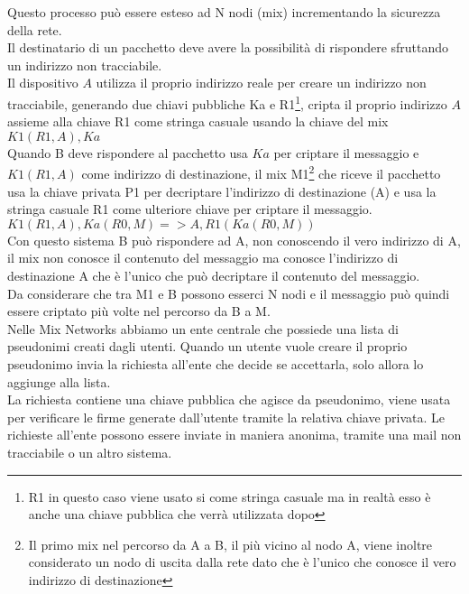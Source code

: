 Questo processo può essere esteso ad N nodi (mix) incrementando la sicurezza della rete. \\
\newline
Il destinatario di un pacchetto deve avere la possibilità di rispondere sfruttando un indirizzo non tracciabile. \\
Il dispositivo $A$ utilizza il proprio indirizzo reale per creare un indirizzo non tracciabile, generando due chiavi pubbliche Ka e R1\footnote{R1 in questo caso viene usato si come stringa casuale ma in realtà esso è anche una chiave pubblica che verrà utilizzata dopo}, cripta il proprio indirizzo $A$ assieme alla chiave R1 come stringa casuale usando la chiave del mix \\
$K1(R1, A), Ka$ \\
Quando B deve rispondere al pacchetto usa $Ka$ per criptare il messaggio e $K1(R1, A)$ come indirizzo di destinazione, il mix M1\footnote{Il primo mix nel percorso da A a B, il più vicino al nodo A, viene inoltre considerato un nodo di uscita dalla rete dato che è l'unico che conosce il vero indirizzo di destinazione} che riceve il pacchetto usa la chiave privata P1 per decriptare l'indirizzo di destinazione (A) e usa la stringa casuale R1 come ulteriore chiave per criptare il messaggio. \\
$K1( R1, A ), Ka( R0, M ) => A, R1( Ka( R0, M ) )$ \\
Con questo sistema B può rispondere ad A, non conoscendo il vero indirizzo di A, il mix non conosce il contenuto del messaggio ma conosce l'indirizzo di destinazione A che è l'unico che può decriptare il contenuto del messaggio. \\
Da considerare che tra M1 e B possono esserci N nodi e il messaggio può quindi essere criptato più volte nel percorso da B a M. \\
Nelle Mix Networks abbiamo un ente centrale che possiede una lista di pseudonimi creati dagli utenti. 
Quando un utente vuole creare il proprio pseudonimo invia la richiesta all'ente che decide se accettarla, solo allora lo aggiunge alla lista. \\
La richiesta contiene una chiave pubblica che agisce da pseudonimo, viene usata per verificare le firme generate dall'utente tramite la relativa chiave privata. 
Le richieste all'ente possono essere inviate in maniera anonima, tramite una mail non tracciabile o un altro sistema. \\
\cite{ChaumMixes}

